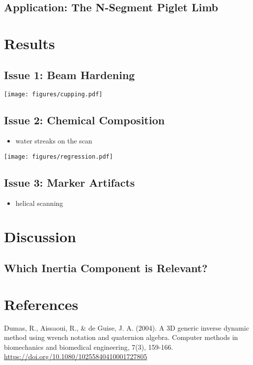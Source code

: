 \subsection{Application: The N-Segment Piglet Limb}
\label{sec:orge697170}

\section{Results}
\label{sec:orgb64af67}
\subsection{Issue 1: Beam Hardening}
\label{sec:org0dd2f2c}

\texttt{[image: figures/cupping.pdf]}

\subsection{Issue 2: Chemical Composition}
\label{sec:org035ffb7}
\begin{itemize}
\item water streaks on the scan
\end{itemize}

\texttt{[image: figures/regression.pdf]}

\subsection{Issue 3: Marker Artifacts}
\label{sec:org21b2146}
\begin{itemize}
\item helical scanning
\end{itemize}

\section{Discussion}
\label{sec:org4ec6dc5}
\subsection{Which Inertia Component is Relevant?}
\label{sec:org69962d6}


\section{References}
\label{sec:orgc2d292c}


Dumas, R., Aissaoui, R., \& de Guise, J. A. (2004). A 3D generic inverse dynamic method using wrench notation and quaternion algebra. Computer methods in biomechanics and biomedical engineering, 7(3), 159-166. \url{https://doi.org/10.1080/10255840410001727805}

